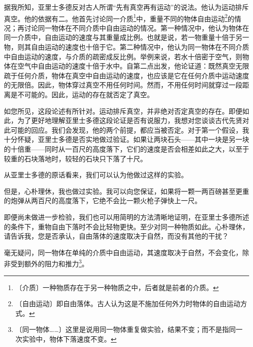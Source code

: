 \documentclass[12pt,UTF-8,openany]{ctexbook}
\begin{document}
\begin{large}
    
    \begin{description}[itemsep=1ex,leftmargin=4.5em,labelwidth=4em]
    
    \item[{\color{script-2-0} 心朴理休}]据我所知，亚里士多德反对古人所谓“先有真空再有运动”的说法。他认为运动排斥真空。他的依据有二。他首先讨论同一介质\footnote{〔介质〕一种物质存在于另一种物质之中，后者就是前者的介质。}中，重量不同的物体自由运动\footnote{〔自由运动〕即自由落体。古人认为这是不施加任何外力时物体的自由运动方式。}的情况；再讨论同一物体在不同介质中自由运动的情况。第一种情况中，他认为物体在同一介质中，自由运动的速度与其重量成比例。也就是说，若一物重量十倍于另一物，则其自由运动的速度也十倍于它。第二种情况中，他认为同一物体在不同介质中自由运动的速度，与介质的疏密成反比例。举例来说，若水十倍密于空气，则物体在空气中自由运动的速度十倍于水中。自第二点出发，他论证道：既然真空无限疏于任何介质，物体在真空中自由运动的速度，也应该是它在任何介质中运动速度的无限倍。因此，物体穿过真空不用任何时间。然而，不用任何时间就穿过一段距离是不可能的。因此，运动的存在就否定了真空。
    
    \item[{\color{script-2-1} 萨为亚第}]如您所见，这段论述有所针对。运动排斥真空，并非绝对否定真空的存在。即便如此，为了更好地理解亚里士多德这段论证是否有说服力，我想对您谈谈古代先贤对此可能的回应。我们会发现，他的两个前提，都应当被否定。对于第一个假设，我十分怀疑，亚里士多德是否实地做过验证。如果让两块石头——其中一块是另一块的十倍重——同时从一百尺的高度落下，它们的速度是否会相差如此之大，以至于较重的石块落地时，较轻的石块只下落了十尺。
    
    \item[{\color{script-2-0} 心朴理休}]从亚里士多德的原话看来，我们可以认为他做过这样的实验。
    
    \item[{\color{script-2-2} 撒格列托}]但是，心朴理休，我也做过实验。我可以向您保证，如果将一颗一两百磅甚至更重的炮弹从两百尺的高度落下，它绝不会比一颗火枪子弹快上一尺。
    
    \item[{\color{script-2-1} 萨为亚第}]即便尚未做进一步检验，我们也可以用简明的方法清晰地证明，在亚里士多德所述的条件下，重物自由下落时不会比轻物更快。至少对同一种物质如此。心朴理休，请告诉我，您是否承认，自由落体的速度取决于自然，而没有其他的干扰？
    
    \item[{\color{script-2-0} 心朴理休}]毫无疑问，同一物体在单纯的介质中自由运动，其速度取决于自然，不会变化，除非受到额外的阻力和推力\footnote{〔同一物体……〕这里是说用同一物体重复做实验，结果不变；而不是指同一次实验中，物体下落速度不变。}。
    

\end{description}
\end{large}
\end{document}
